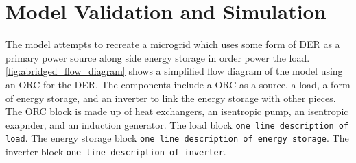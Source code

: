 \chapter{Model Validation and Simulation}
\label{ch:model}

The model attempts to recreate a microgrid which uses some form of DER as a primary power source along side energy storage in order power the load. \autoref{fig:abridged_flow_diagram} shows a simplified flow diagram of the model using an ORC for the DER. The components include a ORC as a source, a load, a form of energy storage, and an inverter to link the energy storage with other pieces. The ORC block is made up of heat exchangers, an isentropic pump, an isentropic exapnder, and an induction generator. The load block \verb|one line description of load|. The energy storage block \verb|one line description of energy storage|. The inverter block \verb|one line description of inverter|.

